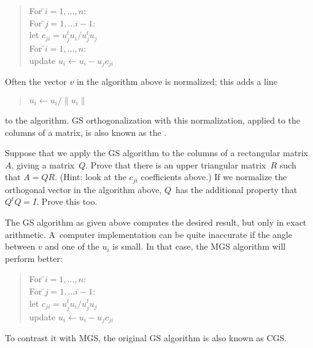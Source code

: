 \begin{quote}
  \begin{tabbing}
    For \=$i=1,\ldots,n$:\\
    \> For \=$j=1,\ldots i-1$:\\
    \>\>let $c_{ji}=u_j^tu_i/u_j^tu_j$\\
    \> For \=$i=1,\ldots,n$:\\
    \>\> update $u_i\leftarrow u_i-u_jc_{ji}$
  \end{tabbing}
\end{quote}

Often the vector $v$ in the algorithm above is normalized; this adds a line
\begin{quote}
  \begin{tabbing}
    $u_i\leftarrow u_i/\|u_i\|$
  \end{tabbing}
\end{quote}
to the algorithm.
\ac{GS} orthogonalization with this normalization,
applied to the columns of a matrix,
is also known as the .

\begin{exercise}
  Suppose that we apply the \ac{GS} algorithm to the columns of a
  rectangular matrix~$A$, giving a matrix~$Q$. Prove that there is an
  upper triangular matrix~$R$ such that $A=QR$. (Hint: look at the
  $c_{ji}$ coefficients above.) If we normalize the
  orthogonal vector in the algorithm above, $Q$~has the additional property
  that $Q^tQ=I$. Prove this too.
\end{exercise}

The \ac{GS} algorithm as given above computes the desired result,
but only in exact arithmetic. A~computer implementation can be quite
inaccurate if the angle between $v$ and one of the $u_i$ is small. In
that case, the \acf{MGS} algorithm will
perform better:

\begin{quote}
  \begin{tabbing}
    For \=$i=1,\ldots,n$:\\
    \> For \=$j=1,\ldots i-1$:\\
    \>\>let $c_{ji}=u_j^tu_i/u_j^tu_j$\\
    \>\> update $u_i\leftarrow u_i-u_jc_{ji}$
  \end{tabbing}
\end{quote}

To contrast it with \ac{MGS}, the original \ac{GS} algorithm is also
known as \acf{CGS}.

